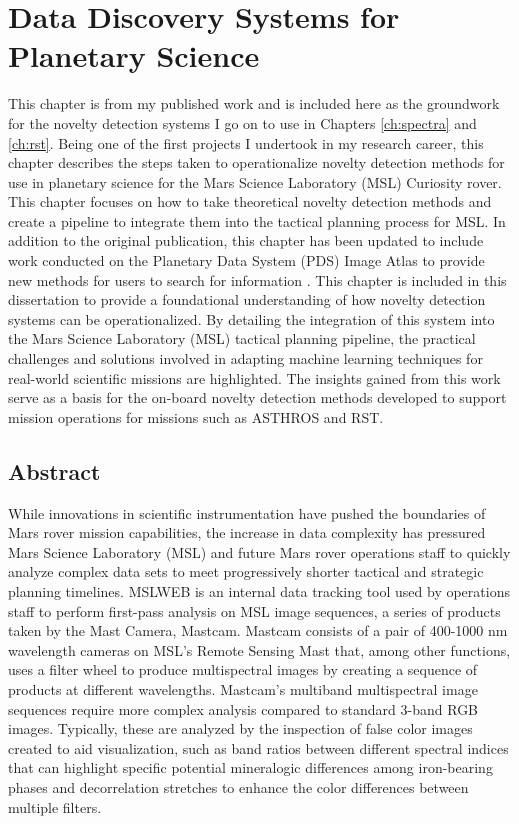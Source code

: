 \chapter[Data Discovery Systems for Planetary Science]{Data Discovery Systems for Planetary Science}
\label{ch:msl}
This chapter is from my published work \cite{horton2021integrating} and is included here as the groundwork for the novelty detection systems I go on to use in Chapters \ref{ch:spectra} and \ref{ch:rst}.
Being one of the first projects I undertook in my research career, this chapter describes the steps taken to operationalize novelty detection methods for use in planetary science for the Mars Science Laboratory (MSL) Curiosity rover.
This chapter focuses on how to take theoretical novelty detection methods and create a pipeline to integrate them into the tactical planning process for MSL.
In addition to the original publication, this chapter has been updated to include work conducted on the Planetary Data System (PDS) Image Atlas to provide new methods for users to search for information \cite{horton2020novelty}.
This chapter is included in this dissertation to provide a foundational understanding of how novelty detection systems can be operationalized.
By detailing the integration of this system into the Mars Science Laboratory (MSL) tactical planning pipeline, the practical challenges and solutions involved in adapting machine learning techniques for real-world scientific missions are highlighted.
The insights gained from this work serve as a basis for the on-board novelty detection methods developed to support mission operations for missions such as ASTHROS and RST. 

\section{Abstract}
While innovations in scientific instrumentation have pushed the boundaries of Mars rover mission capabilities, the increase in data complexity has pressured Mars Science Laboratory (MSL) and future Mars rover operations staff to quickly analyze complex data sets to meet progressively shorter tactical and strategic planning timelines. 
MSLWEB is an internal data tracking tool used by operations staff to perform first-pass analysis on MSL image sequences, a series of products taken by the Mast Camera, Mastcam. 
Mastcam consists of a pair of 400-1000 nm wavelength cameras on MSL's Remote Sensing Mast that, among other functions, uses a filter wheel to produce multispectral images by creating a sequence of products at different wavelengths. 
Mastcam's multiband multispectral image sequences require more complex analysis compared to standard 3-band RGB images. 
Typically, these are analyzed by the inspection of false color images created to aid visualization, such as band ratios between different spectral indices that can highlight specific potential mineralogic differences among iron-bearing phases and decorrelation stretches to enhance the color differences between multiple filters. 

